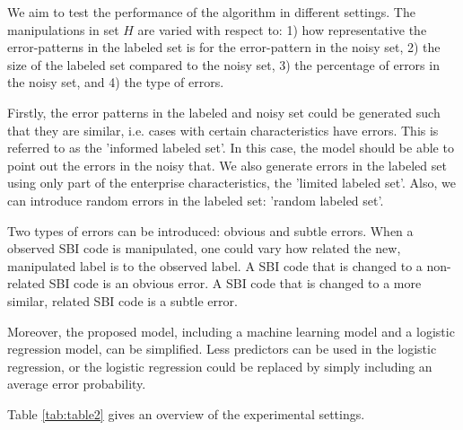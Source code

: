 \documentclass[12pt, a4paper, titlepage]{article}
\begin{document}

We aim to test the performance of the algorithm in different settings. The manipulations in set $H$ are varied with respect to: 1) how representative the error-patterns in the labeled set is for the error-pattern in the noisy set, 2) the size of the labeled set compared to the noisy set, 3) the percentage of errors in the noisy set, and 4) the type of errors. 

Firstly, the error patterns in the labeled and noisy set could be generated such that they are similar, i.e. cases with certain characteristics have errors. This is referred to as the 'informed labeled set'. In this case, the model should be able to point out the errors in the noisy that. We also generate errors in the labeled set using only part of the enterprise characteristics, the 'limited labeled set'. Also, we can introduce random errors in the labeled set: 'random labeled set'. 

Two types of errors can be introduced: obvious and subtle errors. When a observed SBI code is manipulated, one could vary how related the new, manipulated label is to the observed label. A SBI code that is changed to a non-related SBI code is an obvious error. A SBI code that is changed to a more similar, related SBI code is a subtle error.

Moreover, the proposed model, including a machine learning model and a logistic regression model, can be simplified. Less predictors can be used in the logistic regression, or the logistic regression could be replaced by simply including an average error probability.


Table \ref{tab:table2} gives an overview of the experimental settings. 
\end{document}
